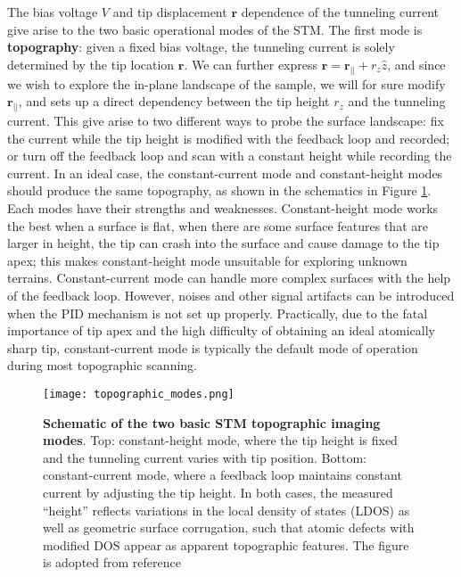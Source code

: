The bias voltage $V$ and tip displacement $\mathbf{r}$ dependence of the tunneling current give arise to the two basic operational modes of the \ac{STM}. The first mode is \textbf{topography}: given a fixed bias voltage, the tunneling current is solely determined by the tip location $\mathbf{r}$. We can further express $\mathbf{r} = \mathbf{r_{||}} + r_z \hat{z}$, and since we wish to explore the in-plane landscape of the sample, we will for sure modify $\mathbf{r_{||}}$, and sets up a direct dependency between the tip height $r_z$ and the tunneling current. This give arise to two different ways to probe the surface landscape: fix the current while the tip height is modified with the feedback loop and recorded; or turn off the feedback loop and scan with a constant height while recording the current. In an ideal case, the constant-current mode and constant-height modes should produce the same topography, as shown in the schematics in Figure \ref{fig:topo_modes}. Each modes have their strengths and weaknesses. Constant-height mode works the best when a surface is flat, when there are some surface features that are larger in height, the tip can crash into the surface and cause damage to the tip apex; this makes constant-height mode unsuitable for exploring unknown terrains. Constant-current mode can handle more complex surfaces with the help of the feedback loop. However, noises and other signal artifacts can be introduced when the PID mechanism is not set up properly. Practically, due to the fatal importance of tip apex and the high difficulty of obtaining an ideal atomically sharp tip, constant-current mode is typically the default mode of operation during most topographic scanning. 

\begin{figure}
	\centering
	\texttt{[image: topographic\_modes.png]}
	\caption[\textbf{Schematic of the two basic STM topographic imaging modes}]{\textbf{Schematic of the two basic STM topographic imaging modes}. Top: constant-height mode, where the tip height is fixed and the tunneling current varies with tip position. Bottom: constant-current mode, where a feedback loop maintains constant current by adjusting the tip height. In both cases, the measured “height” reflects variations in the local density of states (LDOS) as well as geometric surface corrugation, such that atomic defects with modified DOS appear as apparent topographic features. The figure is adopted from reference \cite{stuartScanningTunnellingMicroscopy2021}}
	\label{fig:topo_modes}
\end{figure}

